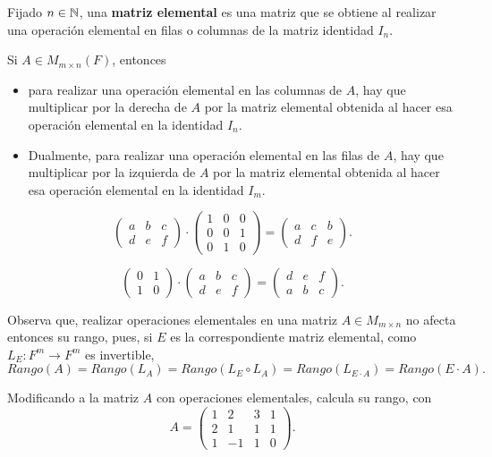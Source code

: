 \begin{defi}
Fijado $n \in \mathbb{N}$, una \textbf{matriz elemental} es una matriz
que se obtiene al realizar una operación elemental en filas o columnas
de la matriz identidad $I_{n}$.
\end{defi}
Si $A \in M_{m \times n}(F)$, entonces
\begin{itemize}
	\item para realizar una operación elemental en las columnas
	de $A$, hay que multiplicar por la derecha de $A$ por la
	matriz elemental obtenida al hacer esa operación elemental
	en la identidad $I_{n}$.
	\item Dualmente, para realizar una operación elemental en 
	las filas de $A$, hay que multiplicar por la izquierda de $A$
	por la matriz elemental obtenida al hacer esa operación elemental 
	en la identidad $I_{m}$.
\end{itemize}

\[
\begin{pmatrix}
a & b & c \\
d & e & f
\end{pmatrix}
\cdot 
\begin{pmatrix}
1 & 0 & 0 \\
0 & 0 & 1 \\
0 & 1 & 0
\end{pmatrix} = 
\begin{pmatrix}
a & c & b \\
d & f & e
\end{pmatrix}.
\]

\[
\begin{pmatrix}
0 & 1 \\
1 & 0
\end{pmatrix} \cdot
\begin{pmatrix}
a & b & c \\
d & e & f
\end{pmatrix} =
\begin{pmatrix}
d & e & f \\
a & b & c
\end{pmatrix}.
\]

Observa que, realizar operaciones elementales en 
una matriz $A \in M_{m \times n}$ no afecta entonces su rango, pues,
si $E$ es la correspondiente matriz elemental,
como $L_{E}: F^{m} \longrightarrow F^{m}$ es invertible,
\[
Rango(A) = Rango(L_{A}) = 
Rango(L_{E} \circ L_{A}) = Rango(L_{E \cdot A}) = Rango(E \cdot A).
\]

\begin{ejem}
Modificando a la matriz $A$ con operaciones elementales, calcula su rango,
con 
\[
A = \begin{pmatrix}
1 & 2 & 3 & 1 \\
2 & 1 & 1 & 1 \\
1 & -1 & 1 & 0
\end{pmatrix}.
\]
\end{ejem}